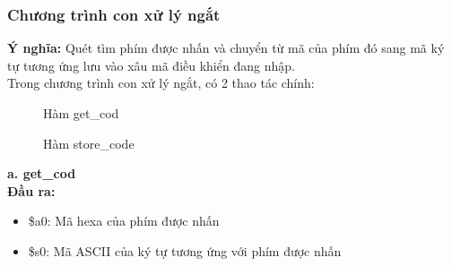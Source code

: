 \documentclass[a4paper,12pt]{article}
\begin{document}
    \subsubsection{Chương trình con xử lý ngắt}
	    \textbf{Ý nghĩa:} Quét tìm phím được nhấn và chuyển từ mã của phím đó sang mã ký tự tương ứng lưu vào xâu mã điều khiển đang nhập.\\
	    Trong chương trình con xử lý ngắt, có 2 thao tác chính:
        \FloatBarrier
        \begin{figure}[ht!]
    	    \centerline{}
    	    \caption{Hàm get\_cod}
    	    \label{fig:bai100}
        \end{figure}
        \FloatBarrier
        \begin{figure}[ht!]
    	    \centerline{}
    	    \caption{Hàm store\_code}
    	    \label{fig:bai100}
        \end{figure}
        \clearpage
        \noindent
    {\textbf{a. get\_cod}} \\
                \textbf{Đầu ra:}
                \begin{itemize}
                    \item \$a0: Mã hexa của phím được nhấn
                    \item \$s0: Mã ASCII của ký tự tương ứng với phím được nhấn
                \end{itemize}
\end{document}
